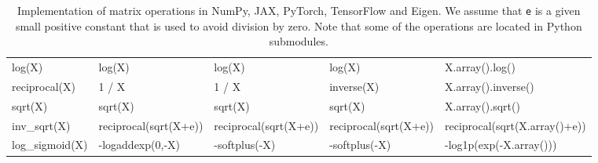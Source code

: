 \documentclass{article}
\begin{document}
\begin{table}[htb]
\begin{tabular}{ p{2.2cm}|p{2.6cm}p{2.6cm}p{2.6cm}p{3.6cm} }
\textsf{log(X)}                & \textsf{log(X)}                 & \textsf{log(X)}                  & \textsf{log(X)}                      & \textsf{X.array().log()}                 \\
\textsf{reciprocal(X)}         & \textsf{1 / X}                  & \textsf{1 / X}                   & \textsf{inverse(X)}                  & \textsf{X.array().inverse()}             \\
\textsf{sqrt(X)}               & \textsf{sqrt(X)}                & \textsf{sqrt(X)}                 & \textsf{sqrt(X)}                     & \textsf{X.array().sqrt()}                \\
\textsf{inv\_sqrt(X)} & \textsf{reciprocal(sqrt(X+e))}  & \textsf{reciprocal(sqrt(X+e))}   & \textsf{reciprocal(sqrt(X+e))}       & \textsf{reciprocal(sqrt(X.array()+e))}   \\
\textsf{log\_sigmoid(X)}       & \textsf{-logaddexp(0,-X)}       & \textsf{-softplus(-X)}           & \textsf{-softplus(-X)}               & \textsf{-log1p(exp(-X.array()))}         \\
 \bottomrule
\end{tabular}
\caption{Implementation of matrix operations in NumPy, JAX, PyTorch, TensorFlow and Eigen.
We assume that \texttt{e} is a given small positive constant that is used to avoid division by zero. Note that some of the operations are located in Python submodules.
}
\label{table:matrix-operations-implementation}
\end{table}
\end{document}
